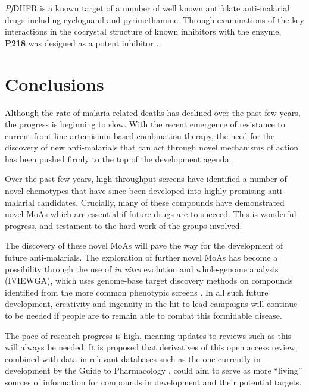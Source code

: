 \documentclass[twocolumn]{bmcart}%
\begin{document}
\textit{Pf}DHFR is a known target of a number of well known antifolate anti-malarial drugs including cycloguanil and pyrimethamine. Through examinations of the key interactions in the cocrystal structure of known inhibitors with the enzyme, \textbf{P218} was designed as a potent inhibitor \cite{Yuthavong2012}.

\section*{Conclusions}
Although the rate of malaria related deaths has declined over the past few years, the progress is beginning to slow. With the recent emergence of resistance to current front-line artemisinin-based combination therapy, the need for the discovery of new anti-malarials that can act through novel mechanisms of action has been pushed firmly to the top of the development agenda.

Over the past few years, high-throughput screens have identified a number of novel chemotypes that have since been developed into highly promising anti-malarial candidates. Crucially, many of these compounds have demonstrated novel MoAs which are essential if future drugs are to succeed. This is wonderful progress, and testament to the hard work of the groups involved.

The discovery of these novel MoAs will pave the way for the development of future anti-malarials. The exploration of further novel MoAs has become a possibility through the use of \textit{in vitro} evolution and whole-genome analysis (IVIEWGA), which uses genome-base target discovery methods on compounds identified from the more common phenotypic screens \cite{Luth2018}. In all such future development, creativity and ingenuity in the hit-to-lead campaigns will continue to be needed if people are to remain able to combat this formidable disease.

The pace of research progress is high, meaning updates to reviews such as this will always be needed. It is proposed that derivatives of this open access review, combined with data in relevant databases such as the one currently in development by the Guide to Pharmacology \cite{gtp}, could aim to serve as more “living” sources of information for compounds in development and their potential targets.

\end{document}
